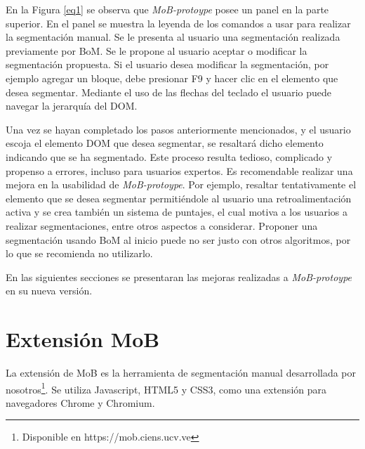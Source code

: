 \documentclass[10pt]{revecom}
\begin{document}
En la Figura \ref{eq1} se observa que \emph{MoB-protoype} posee un panel en la parte superior.
En el panel se muestra la leyenda de los comandos a usar para realizar la segmentación manual. 
Se le presenta al usuario una segmentación realizada previamente por BoM. 
Se le propone al usuario aceptar o modificar la segmentación propuesta. 
Si el usuario desea modificar la segmentación, por ejemplo agregar un bloque, debe presionar F9 y hacer clic en el elemento que desea segmentar. 
Mediante el uso de las flechas del teclado el usuario puede navegar la jerarquía del DOM.

Una vez se hayan completado los pasos anteriormente mencionados, y el usuario escoja el elemento DOM que desea segmentar, se resaltará dicho elemento indicando que se ha segmentado.
Este proceso resulta tedioso, complicado y propenso a errores, incluso para usuarios expertos. 
Es recomendable realizar una mejora en la usabilidad de \emph{MoB-protoype}. 
Por ejemplo, resaltar tentativamente el elemento que se desea segmentar permitiéndole al usuario una retroalimentación activa y se crea también un sistema de puntajes, el cual motiva a los usuarios a realizar segmentaciones, entre otros aspectos a considerar.
Proponer una segmentación usando BoM al inicio puede no ser justo con otros algoritmos, por lo que se recomienda no utilizarlo.

En las siguientes secciones se presentaran las mejoras realizadas a \emph{MoB-protoype} en su nueva versión.

\section{Extensión MoB}
\label{segmentacion_manual}
La extensión de MoB es la herramienta de segmentación manual desarrollada por nosotros\footnote{Disponible en https://mob.ciens.ucv.ve}. Se utiliza Javascript, HTML5 y CSS3, como una extensión para navegadores Chrome y Chromium.
\end{document}

